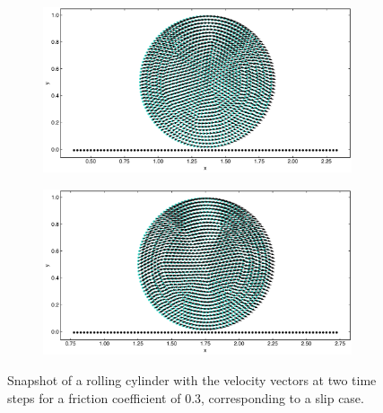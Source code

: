 %
%
\begin{figure}[!htpb]
  \centering
  \begin{subfigure}{0.48\textwidth}
    \centering
    \includegraphics[width=1.0\textwidth]{figures/csph/figures/de_2021_cylinder_rolling_on_an_inclined_plane/fric_coeff_0_3/time0}
    \subcaption{}
  \end{subfigure}
  \begin{subfigure}{0.48\textwidth}
    \centering
    \includegraphics[width=1.0\textwidth]{figures/csph/figures/de_2021_cylinder_rolling_on_an_inclined_plane/fric_coeff_0_3/time1}
    \subcaption{}
  \end{subfigure}
  \caption{Snapshot of a rolling cylinder with the velocity vectors at two
    time steps for a friction coefficient of $0.3$, corresponding to a slip
    case.}
\label{fig:de-2021-rolling-mu-0-3}
\end{figure}
%
